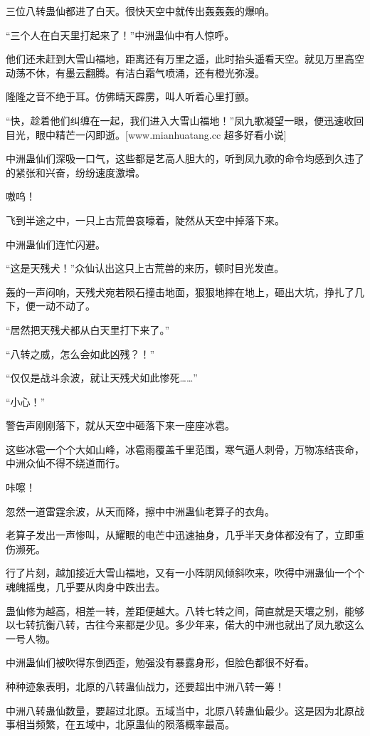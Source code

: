 \begin{this_body}
三位八转蛊仙都进了白天。很快天空中就传出轰轰轰的爆响。

“三个人在白天里打起来了！”中洲蛊仙中有人惊呼。

他们还未赶到大雪山福地，距离还有万里之遥，此时抬头遥看天空。就见万里高空动荡不休，有墨云翻腾。有洁白霜气喷涌，还有橙光弥漫。

隆隆之音不绝于耳。仿佛晴天霹雳，叫人听着心里打颤。

“快，趁着他们纠缠在一起，我们进入大雪山福地！”凤九歌凝望一眼，便迅速收回目光，眼中精芒一闪即逝。[www.mianhuatang.cc 超多好看小说]

中洲蛊仙们深吸一口气，这些都是艺高人胆大的，听到凤九歌的命令均感到久违了的紧张和兴奋，纷纷速度激增。

嗷呜！

飞到半途之中，一只上古荒兽哀嚎着，陡然从天空中掉落下来。

中洲蛊仙们连忙闪避。

“这是天残犬！”众仙认出这只上古荒兽的来历，顿时目光发直。

轰的一声闷响，天残犬宛若陨石撞击地面，狠狠地摔在地上，砸出大坑，挣扎了几下，便一动不动了。

“居然把天残犬都从白天里打下来了。”

“八转之威，怎么会如此凶残？！”

“仅仅是战斗余波，就让天残犬如此惨死……”

“小心！”

警告声刚刚落下，就从天空中砸落下来一座座冰雹。

这些冰雹一个个大如山峰，冰雹雨覆盖千里范围，寒气逼人刺骨，万物冻结丧命，中洲众仙不得不绕道而行。

咔嚓！

忽然一道雷霆余波，从天而降，擦中中洲蛊仙老算子的衣角。

老算子发出一声惨叫，从耀眼的电芒中迅速抽身，几乎半天身体都没有了，立即重伤濒死。

行了片刻，越加接近大雪山福地，又有一小阵阴风倾斜吹来，吹得中洲蛊仙一个个魂魄摇曳，几乎要从肉身中跌出去。

蛊仙修为越高，相差一转，差距便越大。八转七转之间，简直就是天壤之别，能够以七转抗衡八转，古往今来都是少见。多少年来，偌大的中洲也就出了凤九歌这么一号人物。

中洲蛊仙们被吹得东倒西歪，勉强没有暴露身形，但脸色都很不好看。

种种迹象表明，北原的八转蛊仙战力，还要超出中洲八转一筹！

中洲八转蛊仙数量，要超过北原。五域当中，北原八转蛊仙最少。这是因为北原战事相当频繁，在五域中，北原蛊仙的陨落概率最高。


\end{this_body}
